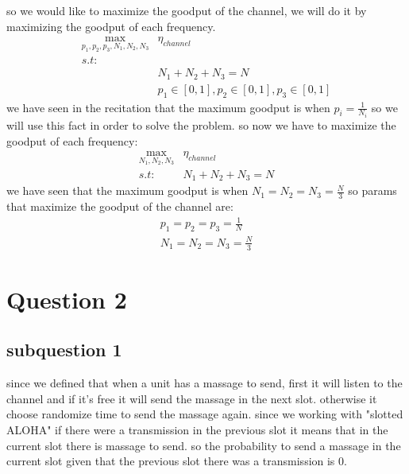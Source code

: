 \documentclass{article}
\begin{document}
\subsubsection{}
so we would like to maximize the goodput of the channel, we will do it by maximizing the goodput of each frequency.\\
\begin{equation}
    \begin{aligned}
        \max_{p_1,p_2,p_3,N_1,N_2,N_3} & \eta_{channel}\\
        s.t:& \\&N_1 + N_2 + N_3 = N\\
        & p_1 \in [0,1], p_2 \in [0,1], p_3 \in [0,1]
    \end{aligned}
\end{equation}
we have seen in the recitation that the maximum goodput is when $p_i = \frac{1}{N_i}$ so we will use this fact in order to solve the problem.
so now we have to maximize the goodput of each frequency:
\begin{equation}
    \begin{aligned}
        \max_{N_1,N_2,N_3} & \eta_{channel}\\
        s.t: &N_1 + N_2 + N_3 = N
    \end{aligned}
\end{equation}
we have seen that the maximum goodput is when $N_1 = N_2 = N_3 = \frac{N}{3}$ so params that maximize the goodput of the channel are:
\begin{equation}
    \begin{aligned}
        p_1 = p_2 = p_3 = \frac{1}{N}\\
        N_1 = N_2 = N_3 = \frac{N}{3}
    \end{aligned}
\end{equation}
\section{Question 2}
\subsection{subquestion 1}

since we defined that when a unit has a massage to send, first it will listen to the channel and if it's free it will send the massage in the next slot. otherwise it choose randomize time to send the massage again.
since we working with "slotted ALOHA" if there were a transmission in the previous slot it means that in the current slot there is massage to send.
so the probability to send a massage in the current slot given that the previous slot there was a transmission is 0.
\end{document}
